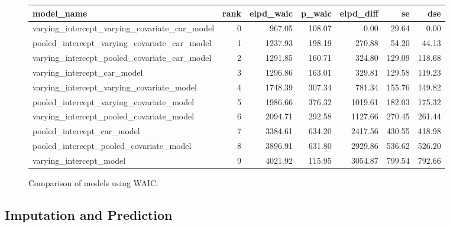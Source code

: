 \documentclass[notitlepage]{article}
\begin{document}
\begin{figure}[ht!]
\centering
\begin{tabular}{lrrrrrr}
\toprule
model\_name &  rank &  elpd\_waic &  p\_waic &  elpd\_diff &      se &     dse \\
\midrule
varying\_intercept\_varying\_covariate\_car\_model &     0 &     967.05 &  108.07 &       0.00 &   29.64 &    0.00 \\
pooled\_intercept\_varying\_covariate\_car\_model  &     1 &    1237.93 &  198.19 &     270.88 &   54.20 &   44.13 \\
varying\_intercept\_pooled\_covariate\_car\_model  &     2 &    1291.85 &  160.71 &     324.80 &  129.09 &  118.68 \\
varying\_intercept\_car\_model                   &     3 &    1296.86 &  163.01 &     329.81 &  129.58 &  119.23 \\
varying\_intercept\_varying\_covariate\_model     &     4 &    1748.39 &  307.34 &     781.34 &  155.76 &  149.82 \\
pooled\_intercept\_varying\_covariate\_model      &     5 &    1986.66 &  376.32 &    1019.61 &  182.03 &  175.32 \\
varying\_intercept\_pooled\_covariate\_model      &     6 &    2094.71 &  292.58 &    1127.66 &  270.45 &  261.44 \\
pooled\_intercept\_car\_model                    &     7 &    3384.61 &  634.20 &    2417.56 &  430.55 &  418.98 \\
pooled\_intercept\_pooled\_covariate\_model       &     8 &    3896.91 &  631.80 &    2929.86 &  536.62 &  526.20 \\
varying\_intercept\_model                       &     9 &    4021.92 &  115.95 &    3054.87 &  799.54 &  792.66 \\
\bottomrule
\end{tabular}
\caption{Comparison of models using WAIC.}
\end{figure}

\subsection{Imputation and Prediction}
\end{document}
